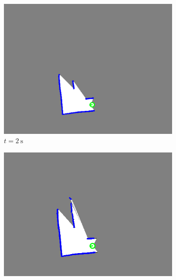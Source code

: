 \subsection{}

\begin{figure}[H]
     \centering
     \begin{subfigure}{0.3\textwidth}
         \centering
         \includegraphics[width=\textwidth]{figures/mapping_2s.png}
         \caption{$t = \SI{2}{\second}$}
         \label{mapping2s}
     \end{subfigure}
     \hfill
     \begin{subfigure}{0.3\textwidth}
         \centering
         \includegraphics[width=\textwidth]{figures/mapping_8s.png}

\end{subfigure}
\end{figure}
